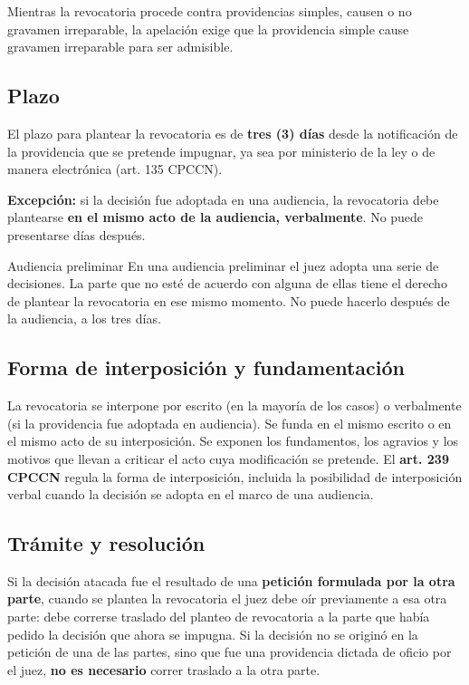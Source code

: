 \documentclass[12pt,oneside]{book}
\begin{document}
\begin{note}
Mientras la revocatoria procede contra providencias simples, causen o no gravamen irreparable, la apelación exige que la providencia simple cause gravamen irreparable para ser admisible.
\end{note}

\subsection{Plazo}

El plazo para plantear la revocatoria es de \textbf{tres (3) días} desde la notificación de la providencia que se pretende impugnar, ya sea por ministerio de la ley o de manera electrónica (art. 135 CPCCN).

\textbf{Excepción:} si la decisión fue adoptada en una audiencia, la revocatoria debe plantearse \textbf{en el mismo acto de la audiencia, verbalmente}. No puede presentarse días después.

\begin{example}{Audiencia preliminar}
En una audiencia preliminar el juez adopta una serie de decisiones. La parte que no esté de acuerdo con alguna de ellas tiene el derecho de plantear la revocatoria en ese mismo momento. No puede hacerlo después de la audiencia, a los tres días.
\end{example}

\subsection{Forma de interposición y fundamentación}

La revocatoria se interpone por escrito (en la mayoría de los casos) o verbalmente (si la providencia fue adoptada en audiencia). Se funda en el mismo escrito o en el mismo acto de su interposición. Se exponen los fundamentos, los agravios y los motivos que llevan a criticar el acto cuya modificación se pretende. El \textbf{art. 239 CPCCN} regula la forma de interposición, incluida la posibilidad de interposición verbal cuando la decisión se adopta en el marco de una audiencia.

\subsection{Trámite y resolución}

Si la decisión atacada fue el resultado de una \textbf{petición formulada por la otra parte}, cuando se plantea la revocatoria el juez debe oír previamente a esa otra parte: debe correrse traslado del planteo de revocatoria a la parte que había pedido la decisión que ahora se impugna. Si la decisión no se originó en la petición de una de las partes, sino que fue una providencia dictada de oficio por el juez, \textbf{no es necesario} correr traslado a la otra parte.
\end{document}
